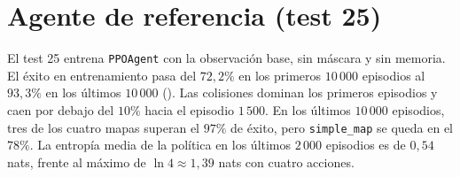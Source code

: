 \begin{table}[htbp]
    \centering
    \caption[Experimentos realizados]{Experimentos realizados. Memoria:
    \textit{implícita} indica la observación ampliada con el último
    desplazamiento.}
    \label{tab:experimentos}
    \small
\end{table}

\section{Agente de referencia (test 25)}\label{sec:resultados_baseline}
El test 25 entrena \texttt{PPOAgent} con la observación base, sin máscara
y sin memoria. El éxito en entrenamiento pasa del $72{,}2\%$ en los
primeros $10\,000$ episodios al $93{,}3\%$ en los últimos $10\,000$
(). Las colisiones dominan los primeros episodios y caen
por debajo del $10\%$ hacia el episodio $1\,500$. En los últimos
$10\,000$ episodios, tres de los cuatro mapas superan el $97\%$ de
éxito, pero \texttt{simple\_map} se queda en el $78\%$. La entropía media de la política en los últimos
$2\,000$ episodios es de $0{,}54$ nats, frente al máximo de
$\ln 4 \approx 1{,}39$ nats con cuatro acciones.

